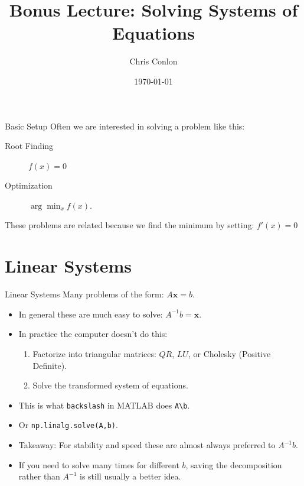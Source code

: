 \documentclass[aspectratio=169,11pt]{beamer}
\title{Bonus Lecture: Solving Systems of Equations}
\author{Chris Conlon  }
\institute{Grad IO}
\date{\today }
\begin{document}
\begin{frame}
\titlepage
\end{frame}

\begin{frame}{Basic Setup}
Often we are interested in solving a problem like this:
\begin{description}
\item[Root Finding] $f(x) = 0 $
\item[Optimization] $\arg \min_x f(x)$.
\end{description}
These problems are related because we find the minimum by setting: $f'(x)=0$
\end{frame}


\section{Linear Systems}
\begin{frame}{Linear Systems}
Many problems of the form: $A \symbf{x} = b$.
\begin{itemize}
\item In general these are much easy to solve: $A^{-1} b = \symbf{x}$.
\item In practice the computer doesn't do this:
\begin{enumerate}
\item Factorize into triangular matrices: $QR$, $LU$, or Cholesky (Positive Definite).
\item Solve the transformed system of equations.
\end{enumerate}
\item This is what \texttt{backslash} in MATLAB does \texttt{A\textbackslash  b}.
\item Or \texttt{np.linalg.solve(A,b)}.
\item Takeaway: For stability and speed these are almost always preferred to $A^{-1}b$.
\item If you need to solve many times for different $b$, saving the decomposition rather than $A^{-1}$ is still usually a better idea.
\end{itemize}
\end{frame}
\end{document}
